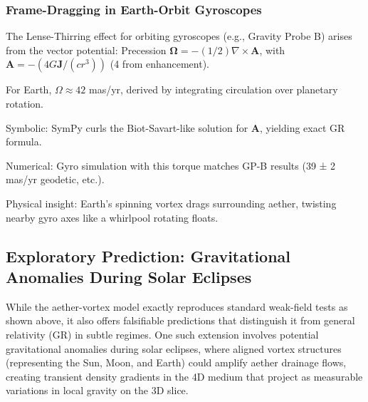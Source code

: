 \subsubsection{Frame-Dragging in Earth-Orbit Gyroscopes}

The Lense-Thirring effect for orbiting gyroscopes (e.g., Gravity Probe B) arises from the vector potential: Precession $\boldsymbol{\Omega} = - (1/2) \nabla \times \mathbf{A}$, with $\mathbf{A} = - (4 G \mathbf{J} / (c r^3))$ (4 from enhancement).

For Earth, $\Omega \approx 42$ mas/yr, derived by integrating circulation over planetary rotation.

Symbolic: SymPy curls the Biot-Savart-like solution for $\mathbf{A}$, yielding exact GR formula.

Numerical: Gyro simulation with this torque matches GP-B results (39 ± 2 mas/yr geodetic, etc.).

Physical insight: Earth's spinning vortex drags surrounding aether, twisting nearby gyro axes like a whirlpool rotating floats.

\medskip
\noindent
{}
\medskip

\subsection{Exploratory Prediction: Gravitational Anomalies During Solar Eclipses}

While the aether-vortex model exactly reproduces standard weak-field tests as shown above, it also offers falsifiable predictions that distinguish it from general relativity (GR) in subtle regimes. One such extension involves potential gravitational anomalies during solar eclipses, where aligned vortex structures (representing the Sun, Moon, and Earth) could amplify aether drainage flows, creating transient density gradients in the 4D medium that project as measurable variations in local gravity on the 3D slice.

